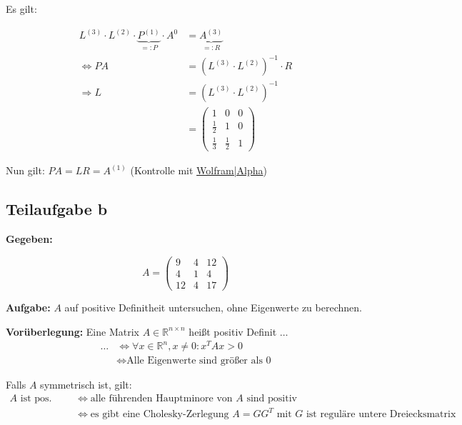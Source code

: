 Es gilt:

\begin{align}
	L^{(3)} \cdot L^{(2)} \cdot \underbrace{P^{(1)}}_{=: P} \cdot A^{0} &= \underbrace{A^{(3)}}_{=: R}\\
	\Leftrightarrow P A &= (L^{(3)} \cdot L^{(2)})^{-1} \cdot R \\
	\Rightarrow L &= (L^{(3)} \cdot L^{(2)})^{-1}\\
	&= \begin{pmatrix}
		1 & 0 & 0\\
		\frac{1}{2} & 1 & 0\\
		\frac{1}{3} & \frac{1}{2} & 1
	\end{pmatrix}
\end{align}

Nun gilt: $P A = L R = A^{(1)}$ (Kontrolle mit \href{http://www.wolframalpha.com/input/?i=%7B%7B1%2C0%2C0%7D%2C%7B0.5%2C1%2C0%7D%2C%7B1%2F3%2C0.5%2C1%7D%7D*%7B%7B6%2C6%2C6%7D%2C%7B0%2C12%2C10%7D%2C%7B0%2C0%2C12%7D%7D}{Wolfram|Alpha})

\subsection*{Teilaufgabe b}

\textbf{Gegeben:}

\[A = 
\begin{pmatrix}
    9 & 4 & 12 \\
    4 & 1  & 4 \\
   12 & 4  & 17
\end{pmatrix}\]

\textbf{Aufgabe:} $A$ auf positive Definitheit untersuchen, ohne Eigenwerte zu berechnen.

\textbf{Vorüberlegung:}
Eine Matrix $A \in \mathbb{R}^{n \times n}$ heißt positiv Definit $\dots$
\begin{align*}
  \dots & \Leftrightarrow \forall x \in \mathbb{R}^n, x \neq 0: x^T A x > 0\\
	& \Leftrightarrow \text{Alle Eigenwerte sind größer als 0}
\end{align*}

Falls $A$ symmetrisch ist, gilt:
\begin{align*}
 \text{$A$ ist pos. Definit} & \Leftrightarrow \text{alle führenden Hauptminore von $A$ sind positiv}\\
	& \Leftrightarrow \text{es gibt eine Cholesky-Zerlegung $A=GG^T$ mit $G$ ist reguläre untere Dreiecksmatrix}\\
\end{align*}

